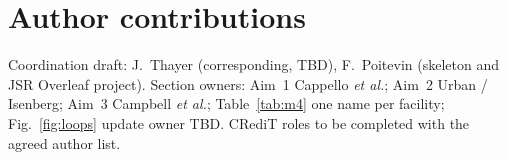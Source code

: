 \documentclass{iucrjournals}
\begin{document}


\section*{Author contributions}
Coordination draft: J.~Thayer (corresponding, TBD), F.~Poitevin (skeleton and
JSR Overleaf project). Section owners: Aim~1 Cappello \textit{et al.}; Aim~2
Urban / Isenberg; Aim~3 Campbell \textit{et al.}; Table~\ref{tab:m4} one name
per facility; Fig.~\ref{fig:loops} update owner TBD. CRediT roles to be
completed with the agreed author list.


\end{document}
